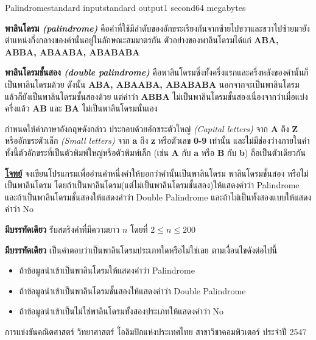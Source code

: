 \documentclass[11pt,a4paper]{article}
\begin{document}
\begin{problem}{Palindrome}{standard input}{standard output}{1 second}{64 megabytes}

\textbf{พาลินโดรม\textit{ (palindrome)}} คือคำที่ใช้มีลำดับของอักขระเรียงกันจากซ้ายไปขวาและขวาไปซ้ายมายังตำแหน่งกึ่งกลางของคำนั้นอยู่ในลักษณะสมมาตรกัน ตัวอย่างของพาลินโดรมได้แก่ \textbf{ABA, ABBA, ABAABA, ABABABA}

\textbf{พาลินโดรมชั้นสอง \textit{(double palindrome)}} คือพาลินโดรมซึ่งทั้งครึ่งแรกและครึ่งหลังของคำนั้นก็เป็นพาลินโดรมด้วย ดังนั้น \textbf{ABA, ABAABA, ABABABA} นอกจากจะเป็นพาลินโดรมแล้วก็ยังเป็นพาลินโดรมชั้นสองด้วย แต่คำว่า \textbf{ABBA} ไม่เป็นพาลินโดรมชั้นสองเนื่องจากว่าเมื่อแบ่งครึ่งแล้ว\textbf{ AB} และ\textbf{ BA} ไม่เป็นพาลินโดรมนั่นเอง

กำหนดให้คำภาษาอังกฤษดังกล่าว ประกอบด้วยอักขระตัวใหญ่ \textit{(Capital letters)} จาก \textbf{A} ถึง \textbf{Z} หรืออักขระตัวเล็ก \textit{(Small letters)} จาก \textbf{a} ถึง \textbf{z} หรือตัวเลข\textbf{ 0-9} เท่านั้น และไม่มีช่องว่างภายในคำ ทั้งนี้ตัวอักขระที่เป็นตัวพิมพ์ใหญ่หรือตัวพิมพ์เล็ก (เช่น \textbf{A} กับ \textbf{a} หรือ \textbf{B} กับ \textbf{b}) ถือเป็นตัวเดียวกัน

\bigskip
\underline{\textbf{โจทย์}}  จงเขียนโปรแกรมเพื่ออ่านคำหนึ่งคำให้บอกว่าคำนั้นเป็นพาลินโดรม พาลินโดรมชั้นสอง หรือไม่เป็นพาลินโดรม โดยถ้าเป็นพาลินโดรม(แต่ไม่เป็นพาลินโดรมชั้นสอง)ให้แสดงคำว่า Palindrome และถ้าเป็นพาลินโดรมชั้นสองให้แสดงคำว่า Double Palindrome และถ้าไม่เป็นทั้งสองแบบให้แสดงคำว่า No

\InputFile

\textbf{มีบรรทัดเดียว} รับสตริงคำที่มีความยาว $n$ โดยที่ $2 \leq n \leq 200$

\OutputFile

\textbf{มีบรรทัดเดียว} เป็นคำตอบว่าเป็นพาลินโดรมประเภทใดหรือไม่ใช่เลย ตามเงื่อนไขดังต่อไปนี้
\begin{itemize}

\item ถ้าข้อมูลนำเข้าเป็นพาลินโดรมให้แสดงคำว่า Palindrome
\item ถ้าข้อมูลนำเข้าเป็นพาลินโดรมชั้นสองให้แสดงคำว่า Double Palindrome
\item ถ้าข้อมูลนำเข้าเป็นไม่ใช่พาลินโดรมทั้งสองประเภทให้แสดงคำว่า No
\end{itemize}

\Examples

\begin{example}
%
%
%
\end{example}


\Source

การแข่งขันคณิตศาสตร์ วิทยาศาสตร์ โอลิมปิกแห่งประเทศไทย สาขาวิชาคอมพิวเตอร์ ประจำปี 2547

\end{problem}
\end{document}
